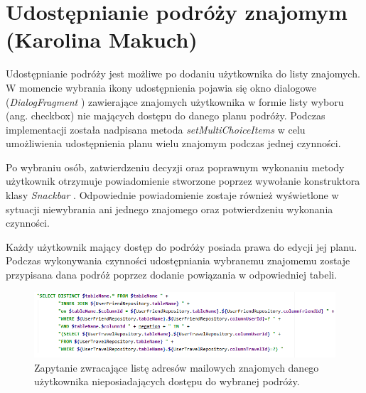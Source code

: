 \documentclass[10pt,twoside,a4paper]{report}
\begin{document}
\section{Udostępnianie podróży znajomym (Karolina Makuch)}

\par  Udostępnianie podróży jest możliwe po dodaniu użytkownika do listy znajomych. W momencie wybrania ikony udostępnienia pojawia się okno dialogowe (\textit{DialogFragment} \cite{DialogFragment}) zawierające znajomych użytkownika w formie  listy wyboru (ang. checkbox) nie mających dostępu do danego planu podróży. Podczas implementacji została nadpisana metoda \textit{setMultiChoiceItems} w celu umożliwienia udostępnienia planu wielu znajomym podczas jednej czynności.
\par  Po wybraniu osób, zatwierdzeniu decyzji oraz poprawnym wykonaniu metody użytkownik otrzymuje powiadomienie stworzone poprzez wywołanie konstruktora klasy \textit{Snackbar}
\cite{Snackbar}. Odpowiednie powiadomienie zostaje również wyświetlone w sytuacji niewybrania ani jednego znajomego oraz potwierdzeniu wykonania czynności.
\par  Każdy użytkownik mający dostęp do podróży posiada prawa do edycji jej planu. Podczas wykonywania czynności udostępniania wybranemu znajomemu zostaje przypisana dana podróż poprzez dodanie powiązania w odpowiedniej tabeli.

\begin{figure}[h]
\centering
\includegraphics[width=\linewidth]{getFriendsBySharedTravel}
\caption{Zapytanie zwracające listę adresów mailowych znajomych danego użytkownika nieposiadających dostępu do wybranej podróży.}
\label{fig:getFriendsBySharedTravel}
\end{figure}
\FloatBarrier
\end{document}
